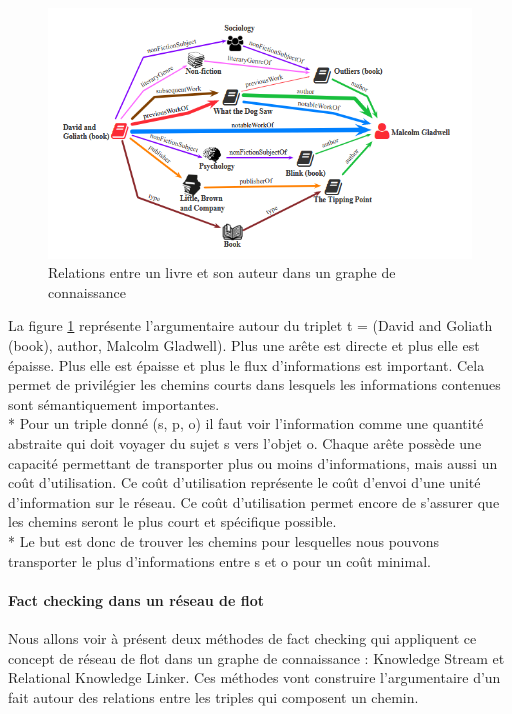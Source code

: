 \begin{figure}[H]
\centering
\includegraphics[width=\textwidth, draft=false]{imgs/bookAuthorKG.PNG}
\caption{Relations entre un livre et son auteur dans un graphe de connaissance \cite{shiralkar2017finding}}
\label{stream}
\end{figure}

La figure \ref{stream} représente l'argumentaire autour du triplet t = (David and Goliath (book), author, Malcolm Gladwell). Plus une arête est directe et plus elle est épaisse. Plus elle est épaisse et plus le flux d'informations est important. Cela permet de privilégier les chemins courts dans lesquels les informations contenues sont sémantiquement importantes. 
\\*
Pour un triple donné (s, p, o) il faut voir l'information comme une quantité abstraite qui doit voyager du sujet s vers l'objet o. Chaque arête possède une capacité permettant de transporter plus ou moins d'informations, mais aussi un coût d'utilisation. Ce coût d'utilisation représente le coût d'envoi d'une unité d'information sur le réseau. Ce coût d'utilisation permet encore de s'assurer que les chemins seront le plus court et spécifique possible.
\\*
Le but est donc de trouver les chemins pour lesquelles nous pouvons transporter le plus d'informations entre s et o pour un coût minimal.

\paragraph{Fact checking dans un réseau de flot}

Nous allons voir à présent deux méthodes de fact checking qui appliquent ce concept de réseau de flot dans un graphe de connaissance : Knowledge Stream et Relational Knowledge Linker. Ces méthodes vont construire l'argumentaire d'un fait autour des relations entre les triples qui composent un chemin.

